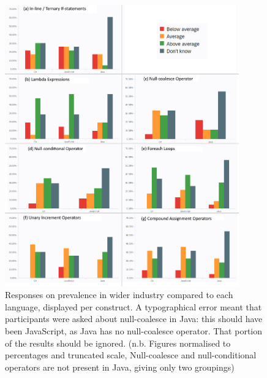 \documentclass{article}
\begin{document}
            \begin{figure}[htbp]
                \centering
                \includegraphics[width=0.9\textwidth]{industry.png}
                \caption{Responses on prevalence in wider industry compared to each language, displayed per construct. A typographical error meant that participants were asked about null-coalesce in Java: this should have been JavaScript, as Java has no null-coalesce operator. That portion of the results should be ignored. (n.b. Figures normalised to percentages and truncated scale, Null-coalesce and null-conditional operators are not present in Java, giving only two groupings)}
                \label{fig:industry}
            \end{figure}
\end{document}
